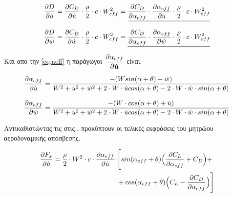 \vspace{0.8cm}

\begin{equation}
   \begin{aligned} 
   \dfrac{\partial D}{\partial \dot{u}} &= \dfrac{\partial C_D}{\partial \dot{u}}\cdot\dfrac{\rho}{2}\cdot c \cdot W_{eff}^2 =\underline{ \dfrac{\partial C_D}{\partial \alpha_{eff}}\cdot \dfrac{\partial \alpha_{eff}}{\partial \dot{u}}\cdot\dfrac{\rho}{2}\cdot c \cdot W_{eff}^2}\\[8pt]
   \dfrac{\partial D}{\partial \dot{w}} &= \dfrac{\partial C_D}{\partial \dot{w}}\cdot\dfrac{\rho}{2}\cdot c \cdot W_{eff}^2 =\underline{ \dfrac{\partial C_D}{\partial \alpha_{eff}}\cdot \dfrac{\partial \alpha_{eff}}{\partial \dot{w}}\cdot\dfrac{\rho}{2}\cdot c \cdot W_{eff}^2}\\
   \end{aligned} 
    \label{eq:partD}
\end{equation}

\vspace{0.8cm}

\noindent Και απο την \cref{eq:aeff} η παράγωγοι $\dfrac{\partial \alpha_{eff}}{\partial \dot{\mathbf{u}}}$ είναι.

\begin{align}
\dfrac{\partial \alpha_{eff}}{\partial \dot{u}} &= \dfrac{-(Wsin(\alpha+\theta)-\dot{w})}{W^2 + \dot{u}^2 + \dot{w}^2 + 2\cdot W\cdot \dot{u} cos(\alpha+\theta) - 2\cdot W \cdot \dot{w} \cdot sin(\alpha+\theta)}\\[8pt]
\dfrac{\partial \alpha_{eff}}{\partial \dot{w}} &= \dfrac{-(W\cdot cos(\alpha+\theta)+\dot{u})}{W^2 + \dot{u}^2 + \dot{w}^2 + 2\cdot W\cdot \dot{u} cos(\alpha+\theta) - 2\cdot W \cdot \dot{w} \cdot sin(\alpha+\theta)}
\label{eq:partAeff}
\end{align}

\vspace{0.8cm}

Αντικαθιστώντας τις  στις , προκύπτουν οι τελικές εκφράσεις του μητρώου αεροδυναμικής απόσβεσης.

\begin{equation}
   \begin{aligned} 
   \dfrac{\partial F_x}{\partial \dot{u}} = \dfrac{\rho}{2}\cdot W^2 \cdot c \cdot \dfrac{\partial \alpha_{eff}}{\partial \dot{u}} \cdot & \Bigg[sin(\alpha_{eff}+\theta)\Big(\dfrac{\partial C_L}{\partial \alpha_{eff}}+C_D\Big) + \\
   &+ cos(\alpha_{eff}+\theta)\Big(C_L-\dfrac{\partial C_D}{\partial \alpha_{eff}}\Big)\Bigg]
   \end{aligned} 
    \label{eq:Fxu}
\end{equation}

